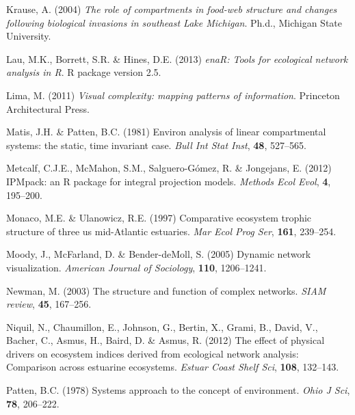 \documentclass[11pt]{article}
\begin{document}
\begin{thebibliography}{75}
Krause, A. (2004) \emph{The role of compartments in food-web structure and
  changes following biological invasions in southeast {Lake Michigan}}.
\newblock Ph.d., Michigan State University.

Lau, M.K., Borrett, S.R. \& Hines, D.E. (2013) \emph{enaR: Tools for ecological
  network analysis in R}.
\newblock R package version 2.5.

Lima, M. (2011) \emph{Visual complexity: mapping patterns of information}.
\newblock Princeton Architectural Press.

Matis, J.H. \& Patten, B.C. (1981) Environ analysis of linear compartmental
  systems: the static, time invariant case.
\newblock \emph{Bull Int Stat Inst}, \textbf{48}, 527--565.

Metcalf, C.J.E., McMahon, S.M., Salguero-G{\'o}mez, R. \& Jongejans, E. (2012)
  {IPM}pack: an {R} package for integral projection models.
\newblock \emph{Methods Ecol Evol}, \textbf{4}, 195--200.

Monaco, M.E. \& Ulanowicz, R.E. (1997) Comparative ecosystem trophic structure
  of three us mid-{A}tlantic estuaries.
\newblock \emph{Mar Ecol Prog Ser}, \textbf{161}, 239--254.

Moody, J., McFarland, D. \& Bender-deMoll, S. (2005) Dynamic network
  visualization.
\newblock \emph{American Journal of Sociology}, \textbf{110}, 1206--1241.

Newman, M. (2003) The structure and function of complex networks.
\newblock \emph{SIAM review}, \textbf{45}, 167--256.

Niquil, N., Chaumillon, E., Johnson, G., Bertin, X., Grami, B., David, V.,
  Bacher, C., Asmus, H., Baird, D. \& Asmus, R. (2012) The effect of physical
  drivers on ecosystem indices derived from ecological network analysis:
  Comparison across estuarine ecosystems.
\newblock \emph{Estuar Coast Shelf Sci}, \textbf{108}, 132--143.

Patten, B.C. (1978) Systems approach to the concept of environment.
\newblock \emph{Ohio J Sci}, \textbf{78}, 206--222.


\end{thebibliography}
\end{document}
